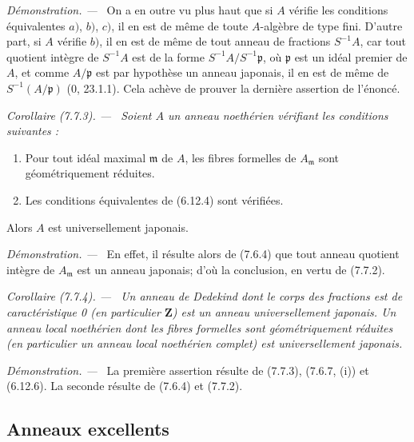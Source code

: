 \documentclass[10pt,oneside]{book}
\newenvironment{corollary}[1][]{%
  \par\medskip\noindent\itshape Corollaire (#1). ---\ }{\par}
\newenvironment{proof}{%
  \par\medskip\noindent\textit{Démonstration. ---\ }}{\par}
\begin{document}
\begin{proof}
On a en outre vu plus haut que si $A$ vérifie les conditions équivalentes
$a)$, $b)$, $c)$, il en est de même de toute $A$-algèbre de type fini. D'autre
part, si $A$ vérifie $b)$, il en est de même de tout anneau de fractions
$S^{-1}A$, car tout quotient intègre de $S^{-1}A$ est de la forme
$S^{-1}A/S^{-1}\mathfrak p$, où $\mathfrak p$ est un idéal premier de $A$, et
comme $A/\mathfrak p$ est par hypothèse un anneau japonais, il en est de même
de $S^{-1}(A/\mathfrak p)$ (0, 23.1.1). Cela achève de prouver la dernière
assertion de l'énoncé.
\end{proof}

\begin{corollary}[7.7.3]
\label{IV.2.s7.7.3-fr}
Soient $A$ un anneau noethérien vérifiant les conditions suivantes :
\begin{enumerate}
\item[\emph{(i)}] Pour tout idéal maximal $\mathfrak m$ de $A$, les fibres
formelles de $A_{\mathfrak m}$ sont géométriquement réduites.
\item[\emph{(ii)}] Les conditions équivalentes de (6.12.4) sont vérifiées.
\end{enumerate}
Alors $A$ est universellement japonais.
\end{corollary}

\begin{proof}
En effet, il résulte alors de (7.6.4) que tout anneau quotient intègre de
$A_{\mathfrak m}$ est un anneau japonais; d'où la conclusion, en vertu de
(7.7.2).
\end{proof}

\begin{corollary}[7.7.4]
\label{IV.2.s7.7.4-fr}
Un anneau de Dedekind dont le corps des fractions est de caractéristique 0 (en
particulier $\mathbf Z$) est un anneau universellement japonais. Un anneau
local noethérien dont les fibres formelles sont géométriquement réduites (en
particulier un anneau local noethérien complet) est universellement japonais.
\end{corollary}

\begin{proof}
La première assertion résulte de (7.7.3), (7.6.7, (i)) et (6.12.6). La seconde
résulte de (7.6.4) et (7.7.2).
\end{proof}

\subsection{Anneaux excellents}
\label{IV.2.ss7.8-fr}
\end{document}
